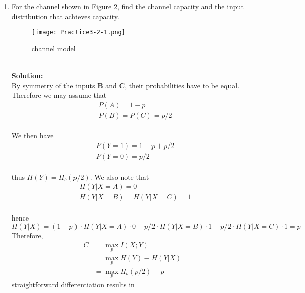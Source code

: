 \documentclass[a4paper,12pt]{article}
\begin{document}
\begin{enumerate}
        \item
            For the channel shown in Figure 2, find the channel capacity and the input distribution that achieves capacity. 
            \begin{figure}[h]
            	\centering
            	\texttt{[image: Practice3-2-1.png]}
            	\caption{channel model}
            \end{figure} \\ 
            \textbf{Solution:} \\
            By symmetry of the inputs \textbf{B} and \textbf{C}, their probabilities have to be equal. Therefore we may assume that 
            $$ 
            \begin{aligned}
                & P(A) = 1 - p \\
                & P(B) = P(C) = p/2
            \end{aligned}
            $$ \\
            We then have 
            $$ 
            \begin{aligned}
                & P(Y = 1) = 1 - p + p/2 \\
                & P(Y = 0) = p/2
            \end{aligned}
            $$ \\
            thus $H(Y) = H_b(p/2)$. We also note that 
            $$ 
            \begin{aligned}
                & H(Y|X = A) = 0 \\
                & H(Y|X = B) = H(Y|X = C) = 1
            \end{aligned}
            $$ \\
            hence $$H(Y|X) = (1 - p) \cdot H(Y|X = A) \cdot 0 + p/2 \cdot H(Y|X = B) \cdot 1 + p/2 \cdot H(Y|X = C) \cdot 1 = p$$
            Therefore, 
            \begin{align*}
                C &= \max_{p} I(X;Y) \\
                  &= \max_{p} H(Y) - H(Y|X) \\
                  &= \max_{p} H_b(p/2) - p
            \end{align*}
            straightforward differentiation results in 

\end{enumerate}
\end{document}
